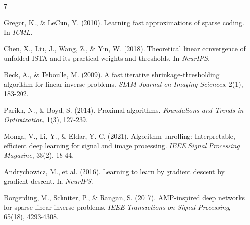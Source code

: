 \documentclass[11pt,a4paper]{article}
\begin{document}
\begin{thebibliography}{7}

Gregor, K., \& LeCun, Y. (2010). Learning fast approximations of sparse coding. In \textit{ICML}.

Chen, X., Liu, J., Wang, Z., \& Yin, W. (2018). Theoretical linear convergence of unfolded ISTA and its practical weights and thresholds. In \textit{NeurIPS}.

Beck, A., \& Teboulle, M. (2009). A fast iterative shrinkage-thresholding algorithm for linear inverse problems. \textit{SIAM Journal on Imaging Sciences}, 2(1), 183-202.

Parikh, N., \& Boyd, S. (2014). Proximal algorithms. \textit{Foundations and Trends in Optimization}, 1(3), 127-239.

Monga, V., Li, Y., \& Eldar, Y. C. (2021). Algorithm unrolling: Interpretable, efficient deep learning for signal and image processing. \textit{IEEE Signal Processing Magazine}, 38(2), 18-44.

Andrychowicz, M., et al. (2016). Learning to learn by gradient descent by gradient descent. In \textit{NeurIPS}.

Borgerding, M., Schniter, P., \& Rangan, S. (2017). AMP-inspired deep networks for sparse linear inverse problems. \textit{IEEE Transactions on Signal Processing}, 65(18), 4293-4308.

\end{thebibliography}
\end{document}

